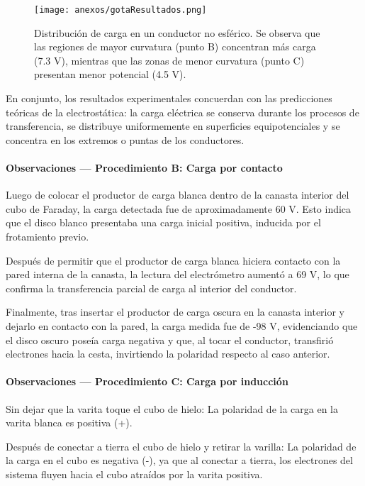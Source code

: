 \documentclass[12pt,a4paper]{article}
\begin{document}
\begin{figure}[H]
    \centering
    \texttt{[image: anexos/gotaResultados.png]}
    \caption{Distribución de carga en un conductor no esférico. Se observa que las regiones de mayor curvatura (punto B) concentran más carga (7.3 V), mientras que las zonas de menor curvatura (punto C) presentan menor potencial (4.5 V).}
    \label{fig:gota}
\end{figure}

En conjunto, los resultados experimentales concuerdan con las predicciones teóricas de la electrostática: la carga eléctrica se conserva durante los procesos de transferencia, se distribuye uniformemente en superficies equipotenciales y se concentra en los extremos o puntas de los conductores.

\paragraph{Observaciones --- Procedimiento B: Carga por contacto}

Luego de colocar el productor de carga blanca dentro de la canasta interior del cubo de Faraday,
la carga detectada fue de aproximadamente 60 V.
Esto indica que el disco blanco presentaba una carga inicial positiva, inducida por el frotamiento previo.

Después de permitir que el productor de carga blanca hiciera contacto con la pared interna de la canasta,
la lectura del electrómetro aumentó a 69 V, lo que confirma la transferencia parcial de carga al interior del conductor.

Finalmente, tras insertar el productor de carga oscura en la canasta interior y dejarlo en contacto con la pared,
la carga medida fue de -98 V, evidenciando que el disco oscuro poseía carga negativa y que, al tocar el conductor, transfirió electrones hacia la cesta, invirtiendo la polaridad respecto al caso anterior.

\paragraph{Observaciones --- Procedimiento C: Carga por inducción} 

Sin dejar que la varita toque el cubo de hielo: La polaridad de la carga en la varita blanca es positiva (+).

Después de conectar a tierra el cubo de hielo y retirar la varilla: La polaridad de la carga en el cubo es negativa (-), ya que al conectar a tierra, los electrones del sistema fluyen hacia el cubo atraídos por la varita positiva.
\end{document}
